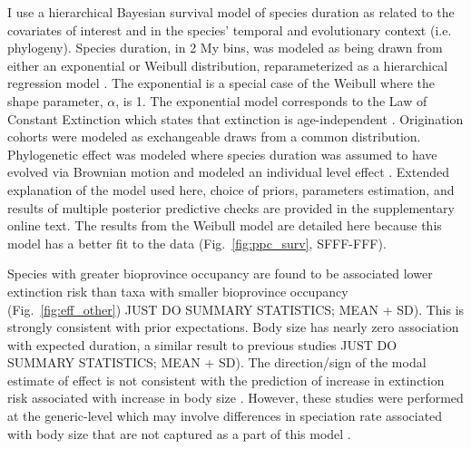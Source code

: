 \documentclass[12pt]{article}
\begin{document}
I use a hierarchical Bayesian survival model of species duration as related to the covariates of interest and in the species' temporal and evolutionary context (i.e. phylogeny). Species duration, in 2 My bins, was modeled as being drawn from either an exponential or Weibull distribution, reparameterized as a hierarchical regression model \cite{Gelman2013d}. The exponential is a special case of the Weibull where the shape parameter, $\alpha$, is 1. The exponential model corresponds to the Law of Constant Extinction which states that extinction is age-independent \cite{VanValen1973}. Origination cohorts were modeled as exchangeable draws from a common distribution. Phylogenetic effect was modeled where species duration was assumed to have evolved via Brownian motion and modeled an individual level effect \cite{Housworth2004}. Extended explanation of the model used here, choice of priors, parameters estimation, and results of multiple posterior predictive checks are provided in the supplementary online text. The results from the Weibull model are detailed here because this model has a better fit to the data (Fig.~\ref{fig:ppc_surv}, SFFF-FFF).

Species with greater bioprovince occupancy are found to be associated lower extinction risk than taxa with smaller bioprovince occupancy (Fig.~\ref{fig:eff_other}) \uppercase{just do summary statistics; mean + sd)}. This is strongly consistent with prior expectations. Body size has nearly zero association with expected duration, a similar result to previous studies \cite{Tomiya2013} \uppercase{just do summary statistics; mean + sd)}.  The direction/sign of the modal estimate of effect is not consistent with the prediction of increase in extinction risk associated with increase in body size \cite{Liow2008}. However, these studies were performed at the generic-level which may involve differences in speciation rate associated with body size that are not captured as a part of this model \cite{Tomiya2013,Liow2008}.
\end{document}
